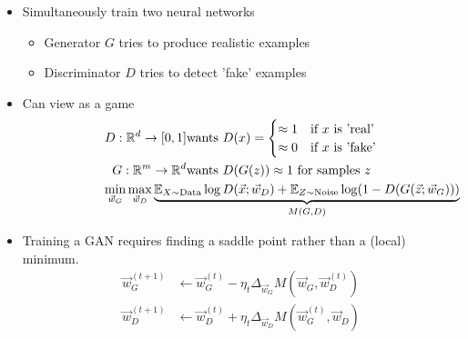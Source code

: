 \documentclass[10pt,a4paper]{scrartcl}
\begin{document}
\begin{multicols*}{2}

\begin{itemize}
\item Simultaneously train two neural networks
\begin{itemize}
\item Generator $G$ tries to produce realistic examples
\item Discriminator $D$ tries to detect 'fake' examples
\end{itemize}
\item Can view as a game
\begin{align*}
D:\mathbb{R}^d\rightarrow [0,1]&\text{wants }D(x)=\begin{cases}\approx 1&\text{if $x$ is 'real'}\\ \approx 0&\text{if $x$ is 'fake'}\end{cases}\\
G:\mathbb{R}^m\rightarrow\mathbb{R}^d&\text{wants }D(G(z))\approx 1 \text{ for samples }z\\
\omit\rlap{$\min\limits_{\vec{w}_G}\max\limits_{\vec{w}_D}\underbrace{\mathbb{E}_{X\sim\text{Data}}\log D(\vec{x};\vec{w}_D)+\mathbb{E}_{Z\sim\text{Noise}}\log(1-D(G(\vec{z};\vec{w}_G)))}_{M(G,D)}$}
\end{align*}
\item Training a GAN requires finding a saddle point rather than a (local) minimum.
\begin{align*}
\vec{w}_G^{(t+1)}&\leftarrow\vec{w}_G^{(t)}-\eta_t\Delta_{\vec{w}_G}M(\vec{w}_G,\vec{w}_D^{(t)})\\
\vec{w}_D^{(t+1)}&\leftarrow\vec{w}_D^{(t)}+\eta_t\Delta_{\vec{w}_D}M(\vec{w}_G^{(t)},\vec{w}_D)
\end{align*}
\end{itemize}

\end{multicols*}
\end{document}
